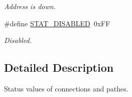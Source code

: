 \begin{DoxyCompactItemize}
\begin{DoxyCompactList}\small\item\em Address is down. \end{DoxyCompactList}\item 
\hypertarget{group___status_values_ga15002df128c27d24f9f25b41d78fa2ae}{\#define \hyperlink{group___status_values_ga15002df128c27d24f9f25b41d78fa2ae}{S\-T\-A\-T\-\_\-\-D\-I\-S\-A\-B\-L\-E\-D}~0x\-F\-F}\label{group___status_values_ga15002df128c27d24f9f25b41d78fa2ae}

\begin{DoxyCompactList}\small\item\em Disabled. \end{DoxyCompactList}\end{DoxyCompactItemize}


\subsection{Detailed Description}
Status values of connections and pathes. 